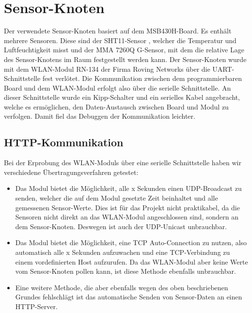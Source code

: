 \documentclass[12pt,a4paper,twoside]{article}
\begin{document}
\section{Sensor-Knoten} \label{sec:sensor}
Der verwendete Sensor-Knoten basiert auf dem MSB430H-Board. Es enthält mehrere Sensoren. Diese sind der SHT11-Sensor , welcher die Temperatur und Luftfeuchtigkeit misst und der MMA 7260Q G-Sensor, 
mit dem die relative Lage des Sensor-Knotens im Raum festgestellt werden kann. Der Sensor-Knoten wurde mit dem WLAN-Modul RN-134 der Firma Roving Networks über die UART-Schnittstelle fest verlötet. 
Die Kommunikation zwischen dem programmierbaren Board und dem WLAN-Modul erfolgt also über die serielle Schnittstelle. An dieser Schnittstelle wurde ein Kipp-Schalter und  ein serielles Kabel angebracht, 
welche es ermöglichen, den Daten-Austausch zwischen Board und Modul zu verfolgen. Damit fiel das Debuggen der Kommunikation leichter.

\subsection{HTTP-Kommunikation}
\label{ssec:HTTP}
Bei der Erprobung des WLAN-Moduls über eine serielle Schnittstelle haben wir verschiedene Übertragungsverfahren getestet: 

\begin{itemize}
 \item Das Modul bietet die Möglichkeit, alle x Sekunden einen UDP-Broadcast zu senden, welcher die auf dem Modul gesetzte Zeit beinhaltet und alle gemessenen Sensor-Werte. Dies ist für das Projekt nicht praktikabel, da die Sensoren nicht direkt an das WLAN-Modul angeschlossen sind, sondern an dem Sensor-Knoten. Deswegen ist auch der UDP-Unicast unbrauchbar.
 \item Das Modul bietet die Möglichkeit, eine TCP Auto-Connection zu nutzen, also automatisch alle x Sekunden aufzuwachen und eine TCP-Verbindung zu einem vordefinierten Host aufzurufen. Da das WLAN-Modul aber keine Werte vom Sensor-Knoten pollen kann, ist diese Methode ebenfalls unbrauchbar. 
 \item Eine weitere Methode, die aber ebenfalls wegen des oben beschriebenen Grundes fehlschlägt ist das automatische Senden von Sensor-Daten an einen HTTP-Server. 
\end{itemize}
\end{document}
